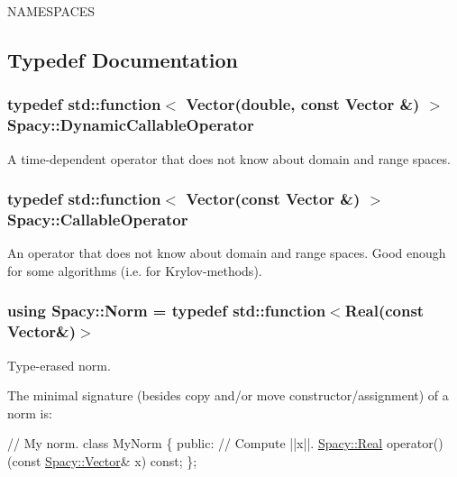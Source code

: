 N\+A\+M\+E\+S\+P\+A\+C\+ES 

\subsection{Typedef Documentation}
\subsubsection[{\texorpdfstring{Dynamic\+Callable\+Operator}{DynamicCallableOperator}}]{\setlength{\rightskip}{0pt plus 5cm}typedef std\+::function$<$ {\bf Vector}(double, const {\bf Vector} \&) $>$ {\bf Spacy\+::\+Dynamic\+Callable\+Operator}}\hypertarget{namespaceSpacy_a052e6b83b913fc316b0c2a2cd9535431}{}\label{namespaceSpacy_a052e6b83b913fc316b0c2a2cd9535431}
A time-\/dependent operator that does not know about domain and range spaces. 
\subsubsection[{\texorpdfstring{Callable\+Operator}{CallableOperator}}]{\setlength{\rightskip}{0pt plus 5cm}typedef std\+::function$<$ {\bf Vector}(const {\bf Vector} \&) $>$ {\bf Spacy\+::\+Callable\+Operator}}\hypertarget{namespaceSpacy_a022a87afa759e18781dd2aea9a80cd73}{}\label{namespaceSpacy_a022a87afa759e18781dd2aea9a80cd73}
An operator that does not know about domain and range spaces. Good enough for some algorithms (i.\+e. for Krylov-\/methods). 
\subsubsection[{\texorpdfstring{Norm}{Norm}}]{\setlength{\rightskip}{0pt plus 5cm}using {\bf Spacy\+::\+Norm} = typedef std\+::function$<${\bf Real}(const {\bf Vector}\&)$>$}\hypertarget{namespaceSpacy_a0dbe77a4e1282ef88017e94d50d17791}{}\label{namespaceSpacy_a0dbe77a4e1282ef88017e94d50d17791}


Type-\/erased norm. 

The minimal signature (besides copy and/or move constructor/assignment) of a norm is\+: 
\begin{DoxyCode}
\textcolor{comment}{// My norm.}
\textcolor{keyword}{class }MyNorm
\{
\textcolor{keyword}{public}:
  \textcolor{comment}{// Compute ||x||.}
  \hyperlink{classSpacy_1_1Real}{Spacy::Real} operator()(\textcolor{keyword}{const} \hyperlink{classSpacy_1_1Vector}{Spacy::Vector}& x) \textcolor{keyword}{const};
\};
\end{DoxyCode}
